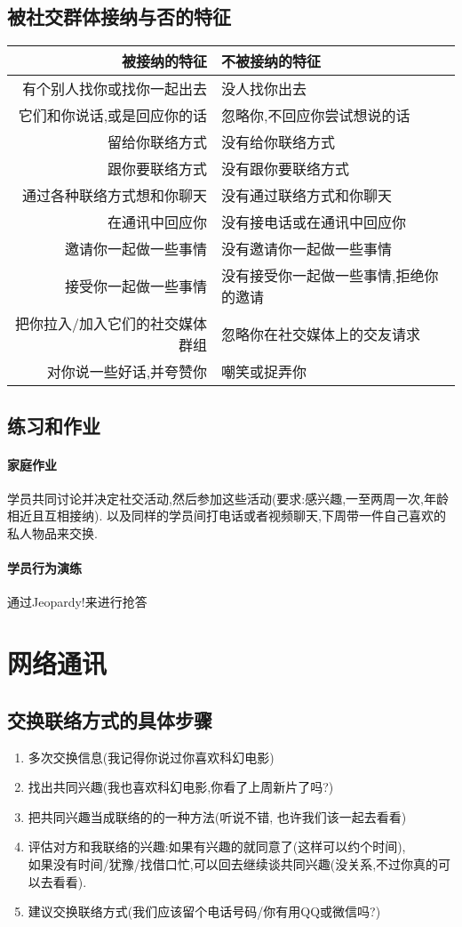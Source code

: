\documentclass[UTF8]{article}
\newcommand{\indList}{\vspace{-6pt}}
\newcommand{\Exer}{\subsection{练习和作业}}
\newcommand{\exer}{\paragraph*{家庭作业}}
\newcommand{\prac}{\paragraph*{学员行为演练}}
\begin{document}
\subsection{被社交群体接纳与否的特征}
\indList
\begin{center}
\begin{tabular}{r|l}
\textbf{被接纳的特征}&\textbf{不被接纳的特征}\\ \hline
有个别人找你或找你一起出去&没人找你出去\\
它们和你说话,或是回应你的话&忽略你,不回应你尝试想说的话\\
留给你联络方式&没有给你联络方式\\
跟你要联络方式&没有跟你要联络方式\\
通过各种联络方式想和你聊天&没有通过联络方式和你聊天\\
在通讯中回应你&没有接电话或在通讯中回应你\\
邀请你一起做一些事情&没有邀请你一起做一些事情\\
接受你一起做一些事情&没有接受你一起做一些事情,拒绝你的邀请\\
把你拉入/加入它们的社交媒体群组&忽略你在社交媒体上的交友请求\\
对你说一些好话,并夸赞你&嘲笑或捉弄你\\
\end{tabular}
\end{center}
\indList\indList

\Exer \exer 学员共同讨论并决定社交活动,然后参加这些活动(要求:感兴趣,一至两周一次,年龄相近且互相接纳). 以及同样的学员间打电话或者视频聊天,下周带一件自己喜欢的私人物品来交换.
\prac 通过Jeopardy!来进行抢答

\newpage
\section{网络通讯}

\subsection{交换联络方式的具体步骤}
\begin{enumerate}
    \item 多次交换信息(我记得你说过你喜欢科幻电影)
    \item 找出共同兴趣(我也喜欢科幻电影,你看了上周新片了吗?)
    \item 把共同兴趣当成联络的的一种方法(听说不错, 也许我们该一起去看看)
    \item 评估对方和我联络的兴趣:如果有兴趣的就同意了(这样可以约个时间),\\ 如果没有时间/犹豫/找借口忙,可以回去继续谈共同兴趣(没关系,不过你真的可以去看看).
    \item 建议交换联络方式(我们应该留个电话号码/你有用QQ或微信吗?)
\end{enumerate}
\end{document}
